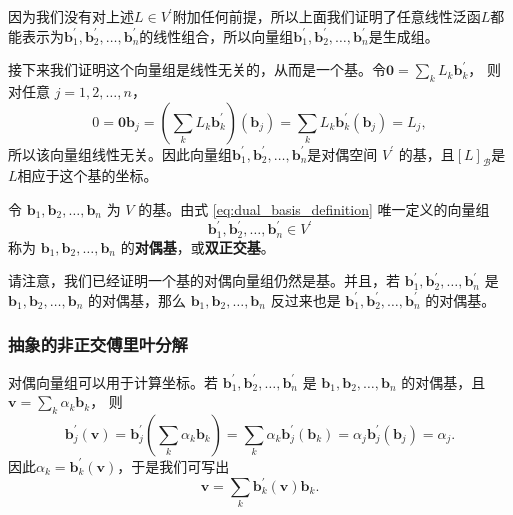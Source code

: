因为我们没有对上述$L\in V^\prime$附加任何前提，所以上面我们证明了任意线性泛函$L$都能表示为$\mathbf{b}_1^\prime,\mathbf{b}_2^\prime,\ldots,\mathbf{b}_n^\prime$的线性组合，所以向量组$\mathbf{b}_1^\prime,\mathbf{b}_2^\prime,\ldots,\mathbf{b}_n^\prime$是生成组。

接下来我们证明这个向量组是线性无关的，从而是一个基。令$\mathbf{0}=\sum_kL_k\mathbf{b}_k^\prime$，
则对任意 $j=1,2,\dots,n$，
\[
    0
    =\mathbf{0}\mathbf{b}_j
    =\left(\sum_kL_k\mathbf{b}_k^\prime\right)(\mathbf{b}_j)
    =\sum_kL_k\mathbf{b}_k^\prime(\mathbf{b}_j)
    =L_j,
\]
所以该向量组线性无关。因此向量组$\mathbf{b}_1^\prime,\mathbf{b}_2^\prime,\ldots,\mathbf{b}_n^\prime$是对偶空间 $V^\prime$ 的基，且$[L]_\mathcal{B}$是$L$相应于这个基的坐标。

\begin{definition}\label{dual_basis_def}
    令 $\mathbf{b}_1,\mathbf{b}_2,\ldots,\mathbf{b}_n$ 为 $V$ 的基。由式 \eqref{eq:dual_basis_definition}
    唯一定义的向量组
    \[
        \mathbf{b}_1^\prime,\mathbf{b}_2^\prime,\ldots,\mathbf{b}_n^\prime\in V^\prime
    \]
    称为 $\mathbf{b}_1,\mathbf{b}_2,\ldots,\mathbf{b}_n$ 的{\bf 对偶基}，或{\bf 双正交基}。
\end{definition}

请注意，我们已经证明一个基的对偶向量组仍然是基。并且，若
$\mathbf{b}_1^\prime,\mathbf{b}_2^\prime,\ldots,\mathbf{b}_n^\prime$ 是
$\mathbf{b}_1,\mathbf{b}_2,\ldots,\mathbf{b}_n$ 的对偶基，那么
$\mathbf{b}_1,\mathbf{b}_2,\ldots,\mathbf{b}_n$ 反过来也是
$\mathbf{b}_1^\prime,\mathbf{b}_2^\prime,\ldots,\mathbf{b}_n^\prime$ 的对偶基。

\subsubsection{抽象的非正交傅里叶分解}

对偶向量组可以用于计算坐标。若
$\mathbf{b}_1^\prime,\mathbf{b}_2^\prime,\ldots,\mathbf{b}_n^\prime$
是 $\mathbf{b}_1,\mathbf{b}_2,\ldots,\mathbf{b}_n$ 的对偶基，且$\mathbf{v}=\sum_k\alpha_k\mathbf{b}_k$，
则
\[
    \mathbf{b}_j^\prime(\mathbf{v})
    =\mathbf{b}_j^\prime\left(\sum_k\alpha_k\mathbf{b}_k\right)
    =\sum_k\alpha_k\mathbf{b}_j^\prime(\mathbf{b}_k)
    =\alpha_j\mathbf{b}_j^\prime(\mathbf{b}_j)
    =\alpha_j.
\]
因此$\alpha_k=\mathbf{b}_k^\prime(\mathbf{v})$，于是我们可写出
\begin{equation}\label{eq:abstract_nonorthogonal_Fourier_decomposition}
    \mathbf{v}
    =\sum_k\mathbf{b}_k^\prime(\mathbf{v})\mathbf{b}_k.
\end{equation}

